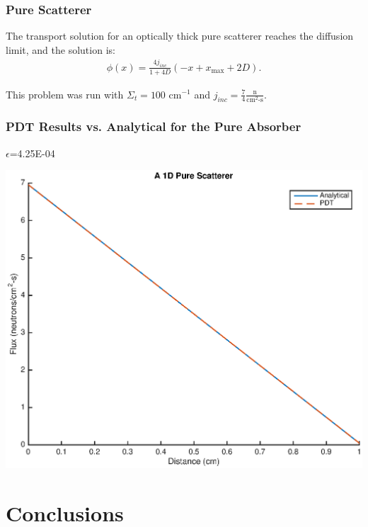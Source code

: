\documentclass[]{beamer}
\begin{document}
\begin{frame}[t]\frametitle{Pure Scatterer}
\begin{block}{}
The transport solution for an optically thick pure scatterer reaches the diffusion limit, and the solution is:
\begin{align*}
\phi(x) = \frac{4j_{inc}}{1+4D}(-x + x_{\text{max}} + 2D).
\end{align*}
\end{block}
\begin{block}{}
This problem was run with $\Sigma_t = 100 \text{ cm}^{-1}$ and $j_{inc} = \frac{7}{4} \frac{\text{n}}{\text{cm}^2\text{-s}}$. 
\end{block}
\end{frame}

\begin{frame}[t]\frametitle{PDT Results vs. Analytical for the Pure Absorber}
\begin{minipage}{0.2\textwidth}
\begin{footnotesize}
$\epsilon$=4.25E-04
\end{footnotesize}
\end{minipage}
\begin{minipage}{0.75\textwidth}
\centering
\includegraphics[scale = 0.5]{figures/PureScatterer.eps}
\end{minipage}

\end{frame}

\section{Conclusions}
\end{document}
